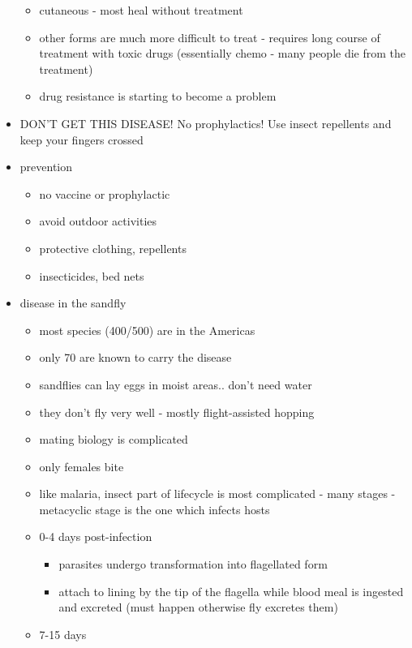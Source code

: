 \documentclass{article}
\begin{document}
\begin{itemize}
\begin{itemize}
            \item cutaneous - most heal without treatment
            \item other forms are much more difficult to treat - requires long course of treatment with toxic drugs (essentially chemo - many people die from the treatment)
            \item drug resistance is starting to become a problem
        \end{itemize}
        \item DON'T GET THIS DISEASE!  No prophylactics!  Use insect repellents and keep your fingers crossed
        \item prevention
        \begin{itemize}
            \item no vaccine or prophylactic
            \item avoid outdoor activities
            \item protective clothing, repellents
            \item insecticides, bed nets
        \end{itemize}
        \item disease in the sandfly
        \begin{itemize}
            \item most species (400/500) are in the Americas
            \item only 70 are known to carry the disease
            \item sandflies can lay eggs in moist areas.. don't need water
            \item they don't fly very well - mostly flight-assisted hopping
            \item mating biology is complicated
            \item only females bite
            \item like malaria, insect part of lifecycle is most complicated - many stages - metacyclic stage is the one which infects hosts
            \item 0-4 days post-infection
            \begin{itemize}
                \item parasites undergo transformation into flagellated form
                \item attach to lining by the tip of the flagella while blood meal is ingested and excreted (must happen otherwise fly excretes them)
            \end{itemize}
            \item 7-15 days

\end{itemize}
\end{itemize}
\end{document}
